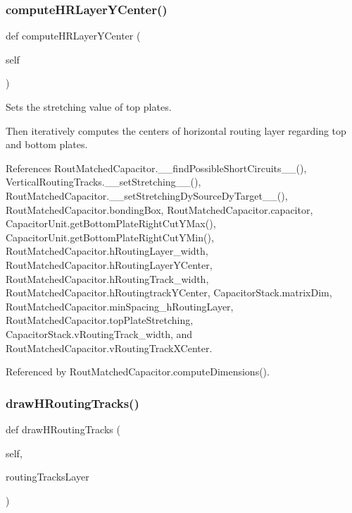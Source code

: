 \subsubsection{\texorpdfstring{compute\+H\+R\+Layer\+Y\+Center()}{computeHRLayerYCenter()}}
{\footnotesize\ttfamily def compute\+H\+R\+Layer\+Y\+Center (\begin{DoxyParamCaption}\item[{}]{self }\end{DoxyParamCaption})}



Sets the stretching value of top plates. 

Then iteratively computes the centers of horizontal routing layer regarding top and bottom plates. 

References Rout\+Matched\+Capacitor.\+\_\+\+\_\+find\+Possible\+Short\+Circuits\+\_\+\+\_\+(), Vertical\+Routing\+Tracks.\+\_\+\+\_\+set\+Stretching\+\_\+\+\_\+(), Rout\+Matched\+Capacitor.\+\_\+\+\_\+set\+Stretching\+Dy\+Source\+Dy\+Target\+\_\+\+\_\+(), Rout\+Matched\+Capacitor.\+bonding\+Box, Rout\+Matched\+Capacitor.\+capacitor, Capacitor\+Unit.\+get\+Bottom\+Plate\+Right\+Cut\+Y\+Max(), Capacitor\+Unit.\+get\+Bottom\+Plate\+Right\+Cut\+Y\+Min(), Rout\+Matched\+Capacitor.\+h\+Routing\+Layer\+\_\+width, Rout\+Matched\+Capacitor.\+h\+Routing\+Layer\+Y\+Center, Rout\+Matched\+Capacitor.\+h\+Routing\+Track\+\_\+width, Rout\+Matched\+Capacitor.\+h\+Routingtrack\+Y\+Center, Capacitor\+Stack.\+matrix\+Dim, Rout\+Matched\+Capacitor.\+min\+Spacing\+\_\+h\+Routing\+Layer, Rout\+Matched\+Capacitor.\+top\+Plate\+Stretching, Capacitor\+Stack.\+v\+Routing\+Track\+\_\+width, and Rout\+Matched\+Capacitor.\+v\+Routing\+Track\+X\+Center.



Referenced by Rout\+Matched\+Capacitor.\+compute\+Dimensions().

\mbox{\label{classpython_1_1capacitorrouted_1_1RoutMatchedCapacitor_a7c8e64a89e225c861bc65ec8e8634df9}} 
\subsubsection{\texorpdfstring{draw\+H\+Routing\+Tracks()}{drawHRoutingTracks()}}
{\footnotesize\ttfamily def draw\+H\+Routing\+Tracks (\begin{DoxyParamCaption}\item[{}]{self,  }\item[{}]{routing\+Tracks\+Layer }\end{DoxyParamCaption})}



